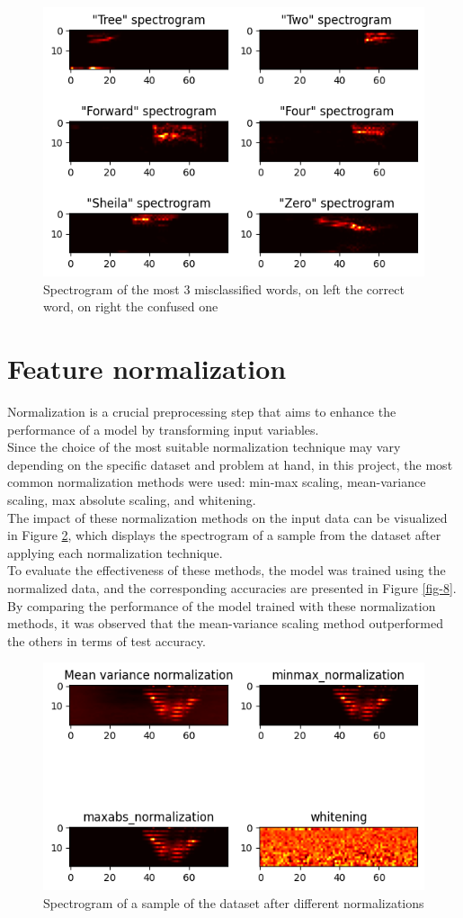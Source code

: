 \documentclass{class}
\begin{document}
\begin{figure}[H]
  \centering
  \includegraphics[width=.7\columnwidth]{images/misclassified_words.png}
  \caption{Spectrogram of the most 3 misclassified words, on left the correct word, on right the confused one}
  \label{fig-6}
\end{figure}

\section{Feature normalization}
Normalization is a crucial preprocessing step that aims to enhance the performance of a model by transforming input variables. \\
Since the choice of the most suitable normalization technique may vary depending on the specific dataset and problem at hand,
in this project, the most common normalization methods were used: min-max scaling, mean-variance scaling, max absolute scaling, and whitening.\\
The impact of these normalization methods on the input data can be visualized in Figure \ref{fig-7}, which displays the spectrogram of a sample from the dataset after applying each normalization technique. \\
To evaluate the effectiveness of these methods, the model was trained using the normalized data, and the corresponding accuracies are presented in Figure \ref{fig-8}.
By comparing the performance of the model trained with these normalization methods, it was observed that the mean-variance scaling method outperformed the others in terms of test accuracy.
\begin{figure}[H]
  \centering
  \includegraphics[width=.7\columnwidth]{images/normalization_spectrogram.png}
  \caption{Spectrogram of a sample of the dataset after different normalizations}
  \label{fig-7}
\end{figure}
\end{document}
